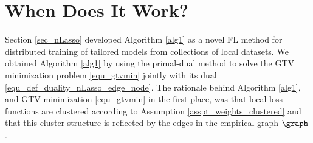 \documentclass[lettersize,journal]{IEEEtran}
\newcommand{\zupdate}{\mathcal{ZU}}
\begin{document}
%   
%
%	
%	


\section{When Does It Work?}
\label{sec_when_does_it_work}


Section \ref{sec_nLasso} developed Algorithm \ref{alg1} as a novel FL method for distributed training of 
tailored models from collections of local datasets. We obtained Algorithm \ref{alg1} by using 
the primal-dual method \cite[Alg. 6]{pock_chambolle_2016} to solve the GTV minimization problem \eqref{equ_gtvmin} 
jointly with its dual \eqref{equ_def_duality_nLasso_edge_node}. 
The rationale behind Algorithm \ref{alg1}, and GTV minimization \eqref{equ_gtvmin} in the first 
place, was that local loss functions are clustered according to Assumption \ref{asspt_weights_clustered} 
and that this cluster structure is reflected by the edges in the empirical graph $\graph$. 
\end{document}
